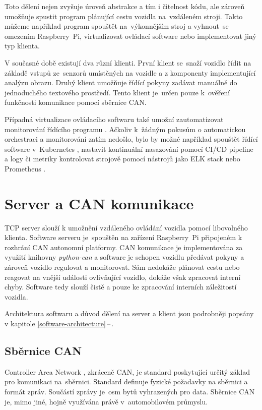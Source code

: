 \documentclass[czech, bachelor]{diploma}
\newcommand{\peteref}[1]{\ref{#1}\,--\,\nameref{#1}}
\begin{document}
Toto dělení nejen zvyšuje úroveň abstrakce a tím i čitelnost kódu, ale zároveň umožňuje spustit program plánující cestu vozidla
na~vzdáleném stroji. Takto můžeme například program spouštět na~výkonnějším stroj a vyhnout~se omezením Raspberry~Pi,
virtualizovat ovládací software \cite{virtualization-source} nebo implementovat jiný typ klienta.

V současné době existují dva různí klienti. První klient se~snaží vozidlo řídit na základě vstupů ze~senzorů umístěných na vozidle
a z komponenty implementující analýzu obrazu. Druhý klient umožňuje řídící pokyny zadávat manuálně do jednoduchého textového
prostředí. Tento klient je~určen pouze k~ověření funkčnosti komunikace pomocí sběrnice CAN.

Případná virtualizace ovládacího softwaru \cite{virtualization-source} také umožní zautomatizovat monitorování řídícího
programu \cite{prometheus-source, elk-source}. Ačkoliv k~žádným pokusům o automatickou orchestraci a monitorování zatím nedošlo,
bylo by možné například spouštět řídící software v~Kubernetes \cite{virtualization-source}, nastavit kontinuální nasazování pomocí CI/CD
pipeline \cite{cicd-source} a logy či metriky kontrolovat strojově pomocí nástrojů jako ELK stack \cite{elk-source} nebo
Prometheus \cite{prometheus-source}.

\chapter{Server a CAN komunikace}

TCP server slouží k umožnění vzdáleného ovládání vozidla pomocí libovolného klienta. Software serveru je~spouštěn na zařízení
Raspberry~Pi připojeném k rozhrání CAN autonomní platformy. CAN komunikace je implementována za využití knihovny \emph{python-can}
a software je schopen vozidlu předávat pokyny a zároveň vozidlo regulovat a monitorovat. Sám nedokáže plánovat cestu nebo reagovat
na vnější události ovlivňující vozidlo, dokáže však zpracovat interní chyby. Software tedy slouží čistě a pouze ke zpracování
interních záležitostí vozidla.

Architektura softwaru a důvod dělení na server a klient jsou podrobněji popsány v kapitole \peteref{software-architecture}.

\section{Sběrnice CAN}

Controller Area Network \cite{can-source}, zkráceně CAN, je standard poskytující určitý základ pro komunikaci na~sběrnici.
Standard definuje fyzické požadavky na sběrnici a formát zpráv. Součástí zprávy je~osm bytů vyhrazených pro data. Sběrnice CAN je,
mimo jiné, hojně využívána právě v~automobilovém průmyslu.
\end{document}
